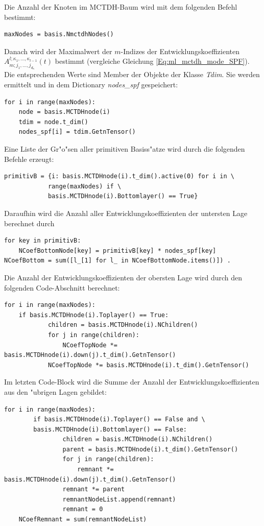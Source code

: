 Die Anzahl der Knoten im MCTDH-Baum wird mit dem folgenden Befehl bestimmt:
\begin{verbatim}
maxNodes = basis.NmctdhNodes()
\end{verbatim}
Danach wird der Maximalwert der $m$-Indizes der Entwicklungskoeffizienten $A^{l;\kappa_{1},...,\kappa_{l-1}}_{m;j_1,...,j_{d_{\kappa}}}(t)$ 
bestimmt (vergleiche Gleichung \ref{Eq:ml_mctdh_mode_SPF}).
Die entsprechenden Werte sind Member der Objekte der Klasse \textit{Tdim}.
Sie werden ermittelt und in dem Dictionary \textit{nodes\_spf} gespeichert:
\begin{verbatim}
for i in range(maxNodes):
    node = basis.MCTDHnode(i)
    tdim = node.t_dim()
    nodes_spf[i] = tdim.GetnTensor() 
\end{verbatim}

Eine Liste der Gr"o"sen aller primitiven Basiss"atze wird durch die folgenden Befehle erzeugt:
\begin{verbatim}
primitivB = {i: basis.MCTDHnode(i).t_dim().active(0) for i in \
            range(maxNodes) if \
            basis.MCTDHnode(i).Bottomlayer() == True}
\end{verbatim}

Daraufhin wird die Anzahl aller Entwicklungskoeffizienten der untersten Lage berechnet durch
\begin{verbatim}
for key in primitivB:
    NCoefBottomNode[key] = primitivB[key] * nodes_spf[key]
NCoefBottom = sum([l_[1] for l_ in NCoefBottomNode.items()]) .
\end{verbatim}

Die Anzahl der Entwicklungskoeffizienten der obersten Lage wird durch den folgenden Code-Abschnitt berechnet:

\begin{verbatim}
for i in range(maxNodes):
    if basis.MCTDHnode(i).Toplayer() == True:
            children = basis.MCTDHnode(i).NChildren()
            for j in range(children):
                NCoefTopNode *= basis.MCTDHnode(i).down(j).t_dim().GetnTensor()
            NCoefTopNode *= basis.MCTDHnode(i).t_dim().GetnTensor()
\end{verbatim}

Im letzten Code-Block wird die Summe der Anzahl der Entwicklungskoeffizienten aus
den "ubrigen Lagen gebildet:

\begin{verbatim}
for i in range(maxNodes):
        if basis.MCTDHnode(i).Toplayer() == False and \
        basis.MCTDHnode(i).Bottomlayer() == False:
                children = basis.MCTDHnode(i).NChildren()
                parent = basis.MCTDHnode(i).t_dim().GetnTensor()
                for j in range(children):
                    remnant *= basis.MCTDHnode(i).down(j).t_dim().GetnTensor() 
                remnant *= parent
                remnantNodeList.append(remnant)
                remnant = 0
    NCoefRemnant = sum(remnantNodeList)
\end{verbatim}

